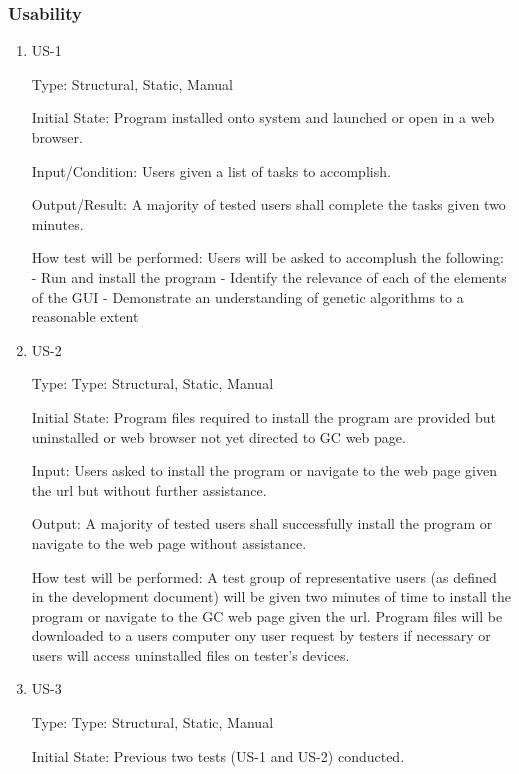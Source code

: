 \documentclass[12pt, titlepage]{article}
\begin{document}
\subsubsection{Usability}

\begin{enumerate}

\item{US-1\\}

Type: Structural, Static, Manual
					
Initial State: Program installed onto system and launched or open in a web browser.
					
Input/Condition: Users given a list of tasks to accomplish.
					
Output/Result: A majority of tested users shall complete the tasks given two minutes.
					
How test will be performed: Users will be asked to accomplush the following:
- Run and install the program
- Identify the relevance of each of the elements of the GUI
- Demonstrate an understanding of genetic algorithms to a reasonable extent

\item{US-2\\}

Type: Type: Structural, Static, Manual
					
Initial State: Program files required to install the program are provided but uninstalled or web browser not yet directed to GC web page.
					
Input: Users asked to install the program or navigate to the web page given the url but without further assistance.
					
Output: A majority of tested users shall successfully install the program or navigate to the web page without assistance.
					
How test will be performed: A test group of representative users (as defined in the development document) will be given two minutes of time to install the program or navigate to the GC web page given the url. Program files will be downloaded to a users computer ony user request by testers if necessary or users will access uninstalled files on tester's devices.

\item{US-3\\}

Type: Type: Structural, Static, Manual
					
Initial State: Previous two tests (US-1 and US-2) conducted.
					

\end{enumerate}
\end{document}
